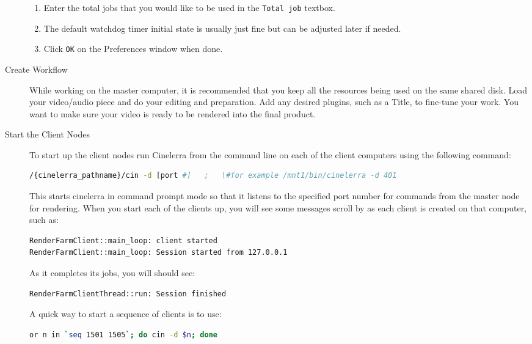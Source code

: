 \begin{description}
\begin{enumerate}
        \item Enter the total jobs that you would like to be used in the \texttt{Total job} textbox.
        \item The default watchdog timer initial state is usually just fine but can be adjusted later if needed.
        \item Click \texttt{OK} on the Preferences window when done.
    \end{enumerate}
    \item[Create Workflow] While working on the master computer, it is recommended that you keep all the resources being used on the same shared disk.  Load your video/audio piece and do your editing and preparation.  Add any desired plugins, such as a Title, to fine-tune your work.  You want to make sure your video is ready to be rendered into the final product.
    \item[Start the Client Nodes] To start up the client nodes run Cinelerra from the command line on each of the client computers using the following command:
    \begin{lstlisting}[language=bash]
/{cinelerra_pathname}/cin -d [port #]   ;   \#for example /mnt1/bin/cinelerra -d 401
    \end{lstlisting}
    This starts cinelerra in command prompt mode so that it listens to the specified port number for commands from the master node for rendering.  When you start each of the clients up, you will see some messages scroll by as each client is created on that computer, such as:
    \begin{lstlisting}[language=bash]
RenderFarmClient::main_loop: client started
RenderFarmClient::main_loop: Session started from 127.0.0.1
    \end{lstlisting}
    As it completes its jobs, you will should see:
    \begin{lstlisting}[language=bash]
RenderFarmClientThread::run: Session finished
    \end{lstlisting}
    A quick way to start a sequence of clients is to use:
    \begin{lstlisting}[language=bash]
or n in `seq 1501 1505`; do cin -d $n; done
    \end{lstlisting}

\end{description}
